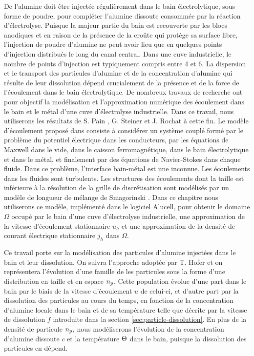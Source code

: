 De l'alumine doit être injectée régulièrement dans le bain
électrolytique, sous forme de poudre, pour compléter l'alumine
dissoute consommée par la réaction d'électrolyse. Puisque la majeur
partie du bain est recouverte par les blocs anodiques et en raison de
la présence de la croûte qui protège sa surface libre, l'injection de
poudre d'alumine ne peut avoir lieu que en quelques points d'injection
distribués le long du canal central. Dans une cuve industrielle, le
nombre de points d'injection est typiquement compris entre 4 et 6. La
dispersion et le transport des particules d'alumine et de la
concentration d'alumine qui résulte de leur dissolution dépend
crucialement de la présence et de la force de l'écoulement dans le
bain électrolytique. De nombreux travaux de recherche ont pour
objectif la modélisation et l'approximation numérique des écoulement
dans le bain et le métal d'une cuve d'électrolyse industrielle. Dans
ce travail, nous utiliserons les résultats de S. Pain \cite{Pain2006},
G. Steiner \cite{Steiner2009} et J. Rochat \cite{Rochat2016} à cette
fin. Le modèle d'écoulement proposé dans \cite{Steiner2009} consiste à
considérer un système couplé formé par le problème du potentiel
électrique dans les conducteurs, par les équations de Maxwell dans le
vide, dans le caisson ferromagnétique, dans le bain électrolytique et
dans le métal, et finalement par des équations de Navier-Stokes dans
chaque fluide. Dans ce problème, l'interface bain-métal est une
inconnue. Les écoulements dans les fluides sont turbulents. Les
structures des écoulements dont la taille est inférieure à la
résolution de la grille de discrétisation sont modélisés par un modèle
de longueur de mélange de Smagorinski \cite{Rochat2016}. Dans ce
chapitre nous utiliserons ce modèle, implémenté dans le logiciel
Alucell, pour obtenir le domaine $\Omega$ occupé par le bain d'une
cuve d'électrolyse industrielle, une approximation de la vitesse
d'écoulement stationnaire $u_h$ et une approximation de la densité de
courant électrique stationnaire $j_h$ dans $\Omega$.

Ce travail porte sur la modélisation des particules d'alumine
injectées dans le bain et leur dissolution. On suivra l'approche
adoptée par T. Hofer \cite{Hofer2011} et on représentera l'évolution
d'une famille de les particules sous la forme d'une distribution en
taille et en espace $n_p$. Cette population évolue d'une part
dans le bain par le biais de la vitesse d'écoulement $u$ de celui-ci,
et d'autre part par la dissolution des particules au cours du temps,
en fonction de la concentration d'alumine locale dans le bain et de sa
température telle que décrite par la vitesse de dissolution $f$
introduite dans la section \ref{sec:particle-dissolution}. En plus de
la densité de particule $n_p$, nous modéliserons l'évolution
de la concentration d'alumine dissoute $c$ et la température
$\Theta$ dans le bain, puisque la dissolution des particules en
dépend.

